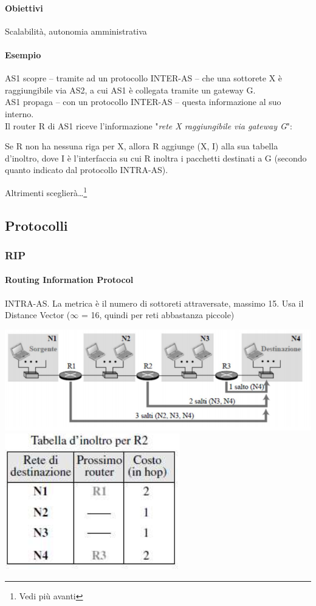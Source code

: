 \documentclass[10pt]{article}
\begin{document}
\paragraph{Obiettivi} Scalabilità, autonomia amministrativa
\paragraph{Esempio} AS1 scopre -- tramite ad un protocollo INTER-AS -- che una sottorete X è raggiungibile via AS2, a cui AS1 è collegata tramite un gateway G.\\
AS1 propaga -- con un protocollo INTER-AS -- questa informazione al suo interno.\\
Il router R di AS1 riceve l'informazione "\textit{rete X raggiungibile via gateway G}":

Se R non ha nessuna riga per X, allora R aggiunge (X, I) alla sua tabella d'inoltro, dove I è l'interfaccia su cui R inoltra i pacchetti destinati a G (secondo quanto indicato dal protocollo INTRA-AS).

Altrimenti sceglierà\ldots\footnote{Vedi più avanti}
\subsection{Protocolli}
\subsubsection{RIP}
\paragraph{Routing Information Protocol} INTRA-AS. La metrica è il numero di sottoreti attraversate, massimo 15. Usa il Distance Vector ($\infty$ = 16, quindi per reti abbastanza piccole)
\begin{center}
\includegraphics[scale=0.7]{rip.png}\\
\includegraphics[scale=0.6]{riptab.png}
\end{center}
\end{document}
